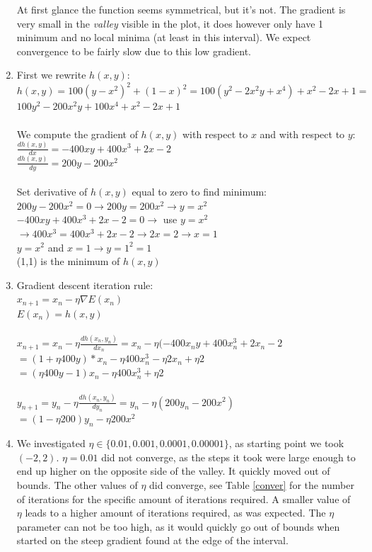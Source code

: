 \documentclass[a4paper,11pt]{article}
\theoremstyle{mytheor}
\begin{document}
\begin{enumerate}
		\noindent At first glance the function seems symmetrical, but it's not. The gradient is very small in the \emph{valley} visible in the plot, it does however only have 1 minimum and no local minima (at least in this interval).
We expect convergence to be fairly slow due to this low gradient.
	\item First we rewrite $h(x,y)$:\\
		$h(x,y) = 100(y - x^2)^2 + (1 - x)^2 = 100(y^2 - 2x^2y + x^4) + x^2 - 2x + 1 =$ \\
		$100y^2 - 200x^2y + 100x^4 + x^2 - 2x + 1$\\
		\\
		We compute the gradient of $h(x,y)$ with respect to $x$ and with respect to $y$:\\
		$\frac{dh(x,y)}{dx} = - 400xy + 400x^3 + 2x - 2$\\
		$\frac{dh(x,y)}{dy} = 200y - 200x^2$\\
		\\
		Set derivative of $h(x,y)$ equal to zero to find minimum:\\
		$200y - 200x^2 = 0 \rightarrow 200y = 200x^2 \rightarrow y = x^2$\\
		$- 400xy + 400x^3 + 2x - 2 = 0 \rightarrow$ use $y = x^2$ $\rightarrow 400x^3 = 400x^3 + 2x - 2 \rightarrow 			2x = 2 \rightarrow x = 1$\\
		$y = x^2$ and $x = 1 \rightarrow y = 1^2 = 1$\\
		(1,1) is the minimum of $h(x,y)$
	\item Gradient descent iteration rule:\\
		$x_{n+1} = x_n - \eta \nabla E(x_n)$\\
		$E(x_n) = h(x,y)$\\
		\\
		$x_{n+1} = x_n - \eta \frac{dh(x_n,y_n)}{dx_n} = x_n - \eta(- 400x_ny + 400x_n^3 + 2x_n - 2$\\
		$= (1 + \eta 400y) * x_n - \eta 400x_n^3 - \eta 2x_n + \eta 2$\\
		$= (\eta 400y - 1)x_n - \eta 400x_n^3 + \eta 2$\\
		\\
		$y_{n+1} = y_n - \eta \frac{dh(x_n,y_n)}{dy_n} = y_n - \eta(200y_n - 200x^2)$\\
		$= (1 - \eta 200)y_n - \eta 200x^2$
	\item We investigated $\eta \in \{0.01, 0.001, 0.0001, 0.00001\}$, as starting point we took $(-2,2)$. $\eta = 0.01$ did not converge, as the steps it took were large enough to end up higher on the opposite side of the valley. It quickly moved out of bounds. The other values of $\eta$ did converge, see Table \ref{conver} for the number of iterations for the specific amount of iterations required. A smaller value of $\eta$ leads to a higher amount of iterations required, as was expected. The $\eta$ parameter can not be too high, as it would quickly go out of bounds when started on the steep gradient found at the edge of the interval.\\

\end{enumerate}
\end{document}
